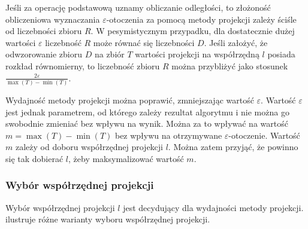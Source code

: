 Jeśli za operację podstawową uznamy obliczanie odległości, to złożoność obliczeniowa wyznaczania $ \varepsilon $-otoczenia za pomocą metody projekcji zależy ściśle od liczebności zbioru $ R $. W pesymistycznym przypadku, dla dostatecznie dużej wartości $ \varepsilon $ liczebność $ R $ może równać się liczebności $ D $. Jeśli założyć, że odwzorowanie zbioru $ D $ na zbiór $ T $ wartości projekcji na współrzędną $ l $ posiada rozkład równomierny, to liczebność zbioru $ R $ można przybliżyć jako stosunek $ \frac{2\varepsilon}{\max(T)-\min(T)} $. 

Wydajność metody projekcji można poprawić, zmniejszając wartość $ \varepsilon $. Wartość $ \varepsilon $ jest jednak parametrem, od którego zależy rezultat algorytmu i nie można go swobodnie zmieniać bez wpływu na wynik. Można za to wpływać na wartość $ m=\max(T)-\min(T) $ bez wpływu na otrzymywane $ \varepsilon $-otoczenie. Wartość $ m $ zależy od doboru współrzędnej projekcji $ l $. Można zatem przyjąć, że powinno się tak dobierać $ l $, żeby maksymalizować wartość $ m $. 

\subsubsection{Wybór współrzędnej projekcji}
Wybór współrzędnej projekcji $ l $ jest decydujący dla wydajności metody projekcji.  ilustruje różne warianty wyboru współrzędnej projekcji. 

